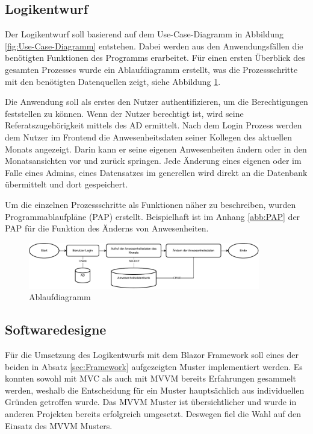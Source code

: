 \subsection{Logikentwurf}
\label{sec:Logikentwurf}
Der Logikentwurf soll basierend auf dem Use-Case-Diagramm in Abbildung \ref{fig:Use-Case-Diagramm} entstehen. Dabei werden aus den Anwendungsfällen die benötigten Funktionen des Programms erarbeitet. Für einen ersten Überblick des gesamten Prozesses wurde ein Ablaufdiagramm erstellt, was die Prozessschritte mit den benötigten Datenquellen zeigt, siehe Abbildung \ref{abb:Flow}.

Die Anwendung soll als erstes den Nutzer authentifizieren, um die Berechtigungen feststellen zu können. Wenn der Nutzer berechtigt ist, wird seine Referatszugehörigkeit mittels des AD ermittelt. Nach dem Login Prozess werden dem Nutzer im Frontend die Anwesenheitsdaten seiner Kollegen des aktuellen Monats angezeigt. Darin kann er seine eigenen Anwesenheiten ändern oder in den Monatsansichten vor und zurück springen. Jede Änderung eines eigenen oder im Falle eines Admins, eines Datensatzes im generellen wird direkt an die Datenbank übermittelt und dort gespeichert.

Um die einzelnen Prozessschritte als Funktionen näher zu beschreiben, wurden Programmablaufpläne (PAP) erstellt. Beispielhaft ist im Anhang \ref{abb:PAP} der PAP für die Funktion des Änderns von Anwesenheiten.

\begin{figure}[htb]
    \centering
    \includegraphics[width=0.9\textwidth,angle=0]{abb/Flow-Diagramm.drawio.pdf}
    \caption[Ablaufdiagramm]{Ablaufdiagramm}
    \label{abb:Flow}
\end{figure}

\subsection{Softwaredesigne}
\label{sec:Softwaredesigne}

Für die Umsetzung des Logikentwurfs mit dem Blazor Framework soll eines der beiden in Absatz \ref{sec:Framework}  aufgezeigten Muster implementiert werden. Es konnten sowohl mit MVC als auch mit MVVM bereits Erfahrungen gesammelt werden, weshalb  die Entscheidung für ein Muster hauptsächlich aus individuellen Gründen getroffen wurde. Das MVVM Muster ist übersichtlicher und wurde in anderen Projekten bereits erfolgreich umgesetzt. Deswegen fiel die Wahl auf den Einsatz des MVVM Musters.

